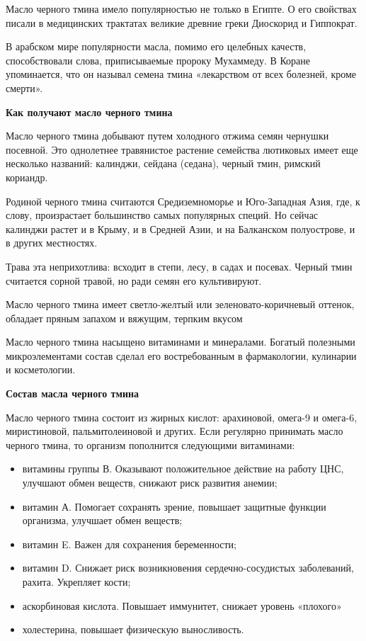 Масло черного тмина имело популярностью не только в Египте. О его свойствах писали в медицинских трактатах великие древние греки Диоскорид и Гиппократ.

В арабском мире популярности масла, помимо его целебных качеств, способствовали слова, приписываемые пророку Мухаммеду. В Коране упоминается, что он называл семена тмина «лекарством от всех болезней, кроме смерти».

\textbf{Как получают масло черного тмина}

Масло черного тмина добывают путем холодного отжима семян чернушки посевной. Это однолетнее травянистое растение семейства лютиковых имеет еще несколько названий: калинджи, сейдана (седана), черный тмин, римский кориандр.

Родиной черного тмина считаются Средиземноморье и Юго-Западная Азия, где, к слову, произрастает большинство самых популярных специй. Но сейчас калинджи растет и в Крыму, и в Средней Азии, и на Балканском полуострове, и в других местностях.

Трава эта неприхотлива: всходит в степи, лесу, в садах и посевах. Черный тмин считается сорной травой, но ради семян его культивируют.

\begin{center}
    \Large
    Масло черного тмина имеет светло-желтый или зеленовато-коричневый оттенок, обладает пряным запахом и вяжущим, терпким вкусом
\end{center}

Масло черного тмина насыщено витаминами и минералами. Богатый полезными микроэлементами состав сделал его востребованным в фармакологии, кулинарии и косметологии.


\textbf{Состав масла черного тмина}

Масло черного тмина состоит из жирных кислот: арахиновой, омега-9 и омега-6, миристиновой, пальмитолеиновой и других. Если регулярно принимать масло черного тмина, то организм пополнится следующими витаминами:


\begin{itemize}
    \item витамины группы В. Оказывают положительное действие на работу ЦНС, улучшают обмен веществ, снижают риск развития анемии;
    \item витамин А. Помогает сохранять зрение, повышает защитные функции организма, улучшает обмен веществ;
    \item витамин E. Важен для сохранения беременности;
    \item витамин D. Снижает риск возникновения сердечно-сосудистых заболеваний, рахита. Укрепляет кости;
    \item аскорбиновая кислота. Повышает иммунитет, снижает уровень «плохого» \item холестерина, повышает физическую выносливость.
\end{itemize}


